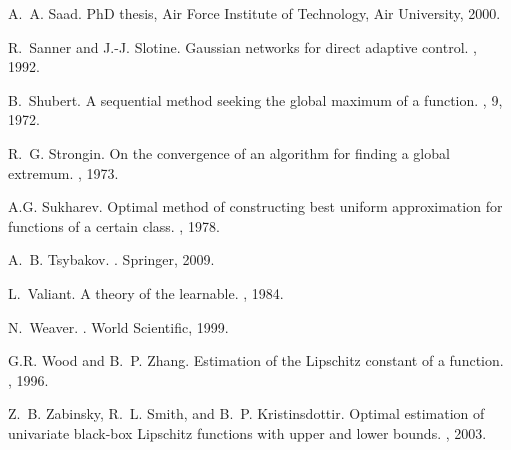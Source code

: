 \documentclass{article} %
\theoremstyle{definition}
\theoremstyle{remark}
\begin{document}
\begin{thebibliography}{10}
	A.~A. Saad.
	\newblock PhD thesis, Air Force Institute of Technology, Air University, 2000.
	
	R.~Sanner and J.-J. Slotine.
	\newblock Gaussian networks for direct adaptive control.
	, 1992.
	
	B.~Shubert.
	\newblock A sequential method seeking the global maximum of a function.
	, 9, 1972.
	
	R.~G. Strongin.
	\newblock On the convergence of an algorithm for finding a global extremum.
	, 1973.
	
	A.G. Sukharev.
	\newblock Optimal method of constructing best uniform approximation for
	functions of a certain class.
	, 1978.
	
	A.~B. Tsybakov.
	.
	\newblock Springer, 2009.
	
	L.~Valiant.
	\newblock A theory of the learnable.
	, 1984.
	
	N.~Weaver.
	.
	\newblock World Scientific, 1999.
	
	G.R. Wood and B.~P. Zhang.
	\newblock Estimation of the {Lipschitz} constant of a function.
	, 1996.
	
	Z.~B. Zabinsky, R.~L. Smith, and B.~P. Kristinsdottir.
	\newblock Optimal estimation of univariate black-box {Lipschitz} functions with
	upper and lower bounds.
	, 2003.
	
\end{thebibliography}
\end{document}
